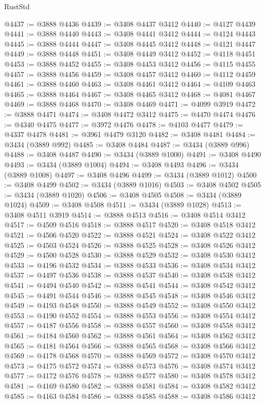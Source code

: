 \begin{lexlean}{RustStd}
\begin{coremodule}
@4437 := @3888 @4436
@4439 := @3408 @4437 @3412
@4440 := @4127 @4439
@4441 := @3888 @4440
@4443 := @3408 @4441 @3412
@4444 := @4124 @4443
@4445 := @3888 @4444
@4447 := @3408 @4445 @3412
@4448 := @4121 @4447
@4449 := @3888 @4448
@4451 := @3408 @4449 @3412
@4452 := @4118 @4451
@4453 := @3888 @4452
@4455 := @3408 @4453 @3412
@4456 := @4115 @4455
@4457 := @3888 @4456
@4459 := @3408 @4457 @3412
@4460 := @4112 @4459
@4461 := @3888 @4460
@4463 := @3408 @4461 @3412
@4464 := @4109 @4463
@4465 := @3888 @4464
@4467 := @3408 @4465 @3412
@4468 := @4081 @4467
@4469 := @3888 @4468
@4470 := @3408 @4469
@4471 := @4099 @3919
@4472 := @3888 @4471
@4474 := @3408 @4472 @3412
@4475 := @4470 @4474
@4476 := @4340 @4475
@4477 := @3972 @4476
@4478 := @4103 @4477
@4479 := @4337 @4478
@4481 := @3961 @4479 @3120
@4482 := @3408 @4481
@4484 := @3434 (@3889 @992)
@4485 := @3408 @4484
@4487 := @3434 (@3889 @996)
@4488 := @3408 @4487
@4490 := @3434 (@3889 @1000)
@4491 := @3408 @4490
@4493 := @3434 (@3889 @1004)
@4494 := @3408 @4493
@4496 := @3434 (@3889 @1008)
@4497 := @3408 @4496
@4499 := @3434 (@3889 @1012)
@4500 := @3408 @4499
@4502 := @3434 (@3889 @1016)
@4503 := @3408 @4502
@4505 := @3434 (@3889 @1020)
@4506 := @3408 @4505
@4508 := @3434 (@3889 @1024)
@4509 := @3408 @4508
@4511 := @3434 (@3889 @1028)
@4513 := @3408 @4511 @3919
@4514 := @3888 @4513
@4516 := @3408 @4514 @3412
@4517 := @4509 @4516
@4518 := @3888 @4517
@4520 := @3408 @4518 @3412
@4521 := @4506 @4520
@4522 := @3888 @4521
@4524 := @3408 @4522 @3412
@4525 := @4503 @4524
@4526 := @3888 @4525
@4528 := @3408 @4526 @3412
@4529 := @4500 @4528
@4530 := @3888 @4529
@4532 := @3408 @4530 @3412
@4533 := @4196 @4532
@4534 := @3888 @4533
@4536 := @3408 @4534 @3412
@4537 := @4497 @4536
@4538 := @3888 @4537
@4540 := @3408 @4538 @3412
@4541 := @4494 @4540
@4542 := @3888 @4541
@4544 := @3408 @4542 @3412
@4545 := @4491 @4544
@4546 := @3888 @4545
@4548 := @3408 @4546 @3412
@4549 := @4193 @4548
@4550 := @3888 @4549
@4552 := @3408 @4550 @3412
@4553 := @4190 @4552
@4554 := @3888 @4553
@4556 := @3408 @4554 @3412
@4557 := @4187 @4556
@4558 := @3888 @4557
@4560 := @3408 @4558 @3412
@4561 := @4184 @4560
@4562 := @3888 @4561
@4564 := @3408 @4562 @3412
@4565 := @4181 @4564
@4566 := @3888 @4565
@4568 := @3408 @4566 @3412
@4569 := @4178 @4568
@4570 := @3888 @4569
@4572 := @3408 @4570 @3412
@4573 := @4175 @4572
@4574 := @3888 @4573
@4576 := @3408 @4574 @3412
@4577 := @4172 @4576
@4578 := @3888 @4577
@4580 := @3408 @4578 @3412
@4581 := @4169 @4580
@4582 := @3888 @4581
@4584 := @3408 @4582 @3412
@4585 := @4163 @4584
@4586 := @3888 @4585
@4588 := @3408 @4586 @3412

\end{coremodule}
\end{lexlean}
